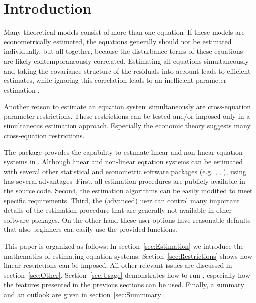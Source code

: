 \section{Introduction}

Many theoretical models consist of more than one equation. If these
models are econometrically estimated, the equations generally should
not be estimated individually, but all together, because the
disturbance terms of these equations are likely contemporaneously
correlated. Estimating all equations simultaneously and taking the
covariance structure of the residuals into account leads to efficient
estimates, while ignoring this correlation leads to an inefficient
parameter estimation \citep{zellner62}.

Another reason to estimate an equation system simultaneously are
cross-equation parameter restrictions. These restrictions can be
tested and/or imposed only in a simultaneous estimation
approach. Especially the economic theory suggests many cross-equation
restrictions.

The  package provides the capability to estimate
linear and non-linear equation systems in .
Although linear and non-linear equation systems can be estimated
with several other statistical and econometric software packages
(e.g. , , ),
using  has several advantages.
First, all estimation procedures are publicly available in the source code.
Second, the estimation algorithms can be easily modified to meet specific
requirements.
Third, the (advanced) user can control many important details of the
estimation procedure that are generally not available in other software
packages.
On the other hand these user options have reasonable defaults that also
beginners can easily use the provided functions.

This paper is organized as follows: In section~\ref{sec:Estimation} we
introduce the mathematics of estimating equation systems.
Section~\ref{sec:Restrictions} shows how linear restrictions can be
imposed.
All other relevant issues are discussed in section~\ref{sec:Other}.
Section~\ref{sec:Usage} demonstrates how to run
, especially how the features presented in the previous
sections can be used.
Finally, a summary and an outlook are given in
section~\ref{sec:Summmary}.

